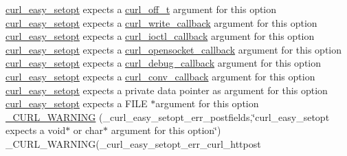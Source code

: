 \begin{DoxyCompactItemize}
\hyperlink{easy_8h_a7b171739b7bb728b3b58b2e6ec454aa0}{curl\+\_\+easy\+\_\+setopt} expects a \hyperlink{curlbuild_8h_a494e2b4279dc064f7ed1d0abd602b28d}{curl\+\_\+off\+\_\+t} argument for this option \hyperlink{easy_8h_a7b171739b7bb728b3b58b2e6ec454aa0}{curl\+\_\+easy\+\_\+setopt} expects a \hyperlink{curl_8h_ad65e62dcde45b356254b0f25f38dd802}{curl\+\_\+write\+\_\+callback} argument for this option \hyperlink{easy_8h_a7b171739b7bb728b3b58b2e6ec454aa0}{curl\+\_\+easy\+\_\+setopt} expects a \hyperlink{curl_8h_ae0524f6ec082005e39eb275c71c59a3b}{curl\+\_\+ioctl\+\_\+callback} argument for this option \hyperlink{easy_8h_a7b171739b7bb728b3b58b2e6ec454aa0}{curl\+\_\+easy\+\_\+setopt} expects a \hyperlink{curl_8h_a1b8b8f3e1a4e538a6bb1dd83a3388547}{curl\+\_\+opensocket\+\_\+callback} argument for this option \hyperlink{easy_8h_a7b171739b7bb728b3b58b2e6ec454aa0}{curl\+\_\+easy\+\_\+setopt} expects a \hyperlink{curl_8h_a50147c55283ee1fa3322b0d5aff2326c}{curl\+\_\+debug\+\_\+callback} argument for this option \hyperlink{easy_8h_a7b171739b7bb728b3b58b2e6ec454aa0}{curl\+\_\+easy\+\_\+setopt} expects a \hyperlink{curl_8h_acb230bf6dbf7bcb6e4e8740ea42ca3b3}{curl\+\_\+conv\+\_\+callback} argument for this option \hyperlink{easy_8h_a7b171739b7bb728b3b58b2e6ec454aa0}{curl\+\_\+easy\+\_\+setopt} expects a private data pointer as argument for this option \hyperlink{easy_8h_a7b171739b7bb728b3b58b2e6ec454aa0}{curl\+\_\+easy\+\_\+setopt} expects a F\+I\+LE $\ast$argument for this option \hyperlink{typecheck-gcc_8h_a0df309c29bbc3a1689b28d104fe9e3a0}{\+\_\+\+C\+U\+R\+L\+\_\+\+W\+A\+R\+N\+I\+NG} (\+\_\+curl\+\_\+easy\+\_\+setopt\+\_\+err\+\_\+postfields,\char`\"{}curl\+\_\+easy\+\_\+setopt expects a void$\ast$ or char$\ast$ argument for this option\char`\"{}) \+\_\+\+C\+U\+R\+L\+\_\+\+W\+A\+R\+N\+I\+NG(\+\_\+curl\+\_\+easy\+\_\+setopt\+\_\+err\+\_\+curl\+\_\+httpost
\item 

\end{DoxyCompactItemize}
